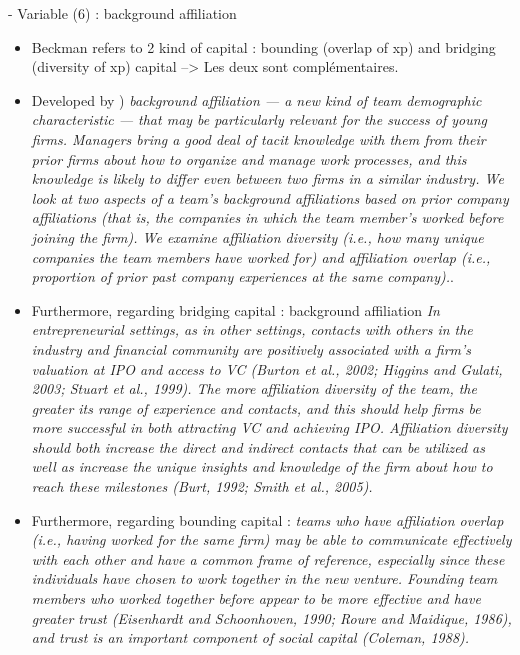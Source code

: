 \begin{itemize}
\begin{itemize}
- Variable (6) : background affiliation
\begin{itemize}
  \item Beckman refers to 2 kind of capital : bounding (overlap of xp) and bridging (diversity of xp) capital --> Les deux sont complémentaires.
  \item Developed by \citep{beckman2007early}) \textit{background affiliation — a new kind of team demographic characteristic — that may be particularly relevant for the success of young firms. Managers bring a good deal of tacit knowledge with them from their prior firms about how to organize and manage work processes, and this knowledge is likely to differ even between two firms in a similar industry. We look at two aspects of a team’s background affiliations based on prior company affiliations (that is, the companies in which the team member’s worked before joining the firm). We examine affiliation diversity (i.e., how many unique companies the team members have worked for) and affiliation overlap (i.e., proportion of prior past company experiences at the same company).}.
  \item Furthermore, regarding bridging capital : background affiliation \textit{In entrepreneurial settings, as in other settings, contacts with others in the industry and financial community are positively associated with a firm’s valuation at IPO and access to VC (Burton et al., 2002; Higgins and Gulati, 2003; Stuart et al., 1999). The more affiliation diversity of the team, the greater its range of experience and contacts, and this should help firms be more successful in both attracting VC and achieving IPO. Affiliation diversity should both increase the direct and indirect contacts that can be utilized as well as increase the unique insights and knowledge of the firm about how to reach these milestones (Burt, 1992; Smith et al., 2005).}
  \item Furthermore, regarding bounding capital : \textit{teams who have affiliation overlap (i.e., having worked for the same firm) may be able to communicate effectively with each other and have a common frame of reference, especially since these individuals have chosen to work together in the new venture. Founding team members who worked together before appear to be more effective and have greater trust (Eisenhardt and Schoonhoven, 1990; Roure and Maidique, 1986), and trust is an important component of social capital (Coleman, 1988).}
\end{itemize}


\end{itemize}
\end{itemize}
